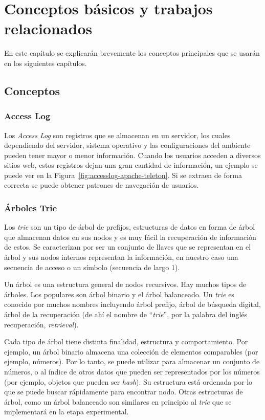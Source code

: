 \chapter[Conceptos Básicos]{Conceptos básicos y trabajos relacionados} \label{ch:Conceptos-Basicos}





En este capítulo se explicarán brevemente los conceptos principales que se usarán en los siguientes capítulos.


\section{Conceptos}

\subsection{Access Log}\label{concept-accesslog}

Los \emph{Access Log} son registros que se almacenan en un servidor, los cuales dependiendo del servidor, sistema operativo y las configuraciones del ambiente pueden tener mayor o menor información. Cuando los usuarios acceden a diversos sitios web, estos registros dejan una gran cantidad de información, un ejemplo se puede ver en la Figura~\ref{fig:accesslog-apache-teleton}. Si se extraen de forma correcta se puede obtener patrones de navegación de usuarios. 


\subsection{Árboles Trie} \label{concept-trie}

Los \emph{trie} son un tipo de árbol de prefijos, estructuras de datos en forma de árbol que almacenan datos en sus nodos y es muy fácil la recuperación de información de estos. Se caracterizan por ser un conjunto de llaves que se representan en el árbol y sus nodos internos representan la información, en nuestro caso una secuencia de acceso o un símbolo (secuencia de largo 1). 

Un árbol es una estructura general de nodos recursivos. Hay muchos tipos de árboles. Los populares son árbol binario y el árbol balanceado. Un \emph{trie} es conocido por muchos nombres incluyendo árbol prefijo, árbol de búsqueda digital, árbol de la recuperación (de ahí el nombre de ``\emph{trie}'', por la palabra del inglés recuperación, \emph{retrieval}).

Cada tipo de árbol tiene distinta finalidad, estructura y comportamiento. Por ejemplo, un árbol binario almacena una colección de elementos comparables (por ejemplo, números). Por lo tanto, se puede utilizar para almacenar un conjunto de números, o al índice de otros datos que pueden ser representados por los números (por ejemplo, objetos que pueden ser \emph{hash}). Su estructura está ordenada por lo que se puede buscar rápidamente para encontrar nodo. Otras estructuras de árbol, como un árbol balanceado son similares en principio al \emph{trie} que se implementará en la etapa experimental.

